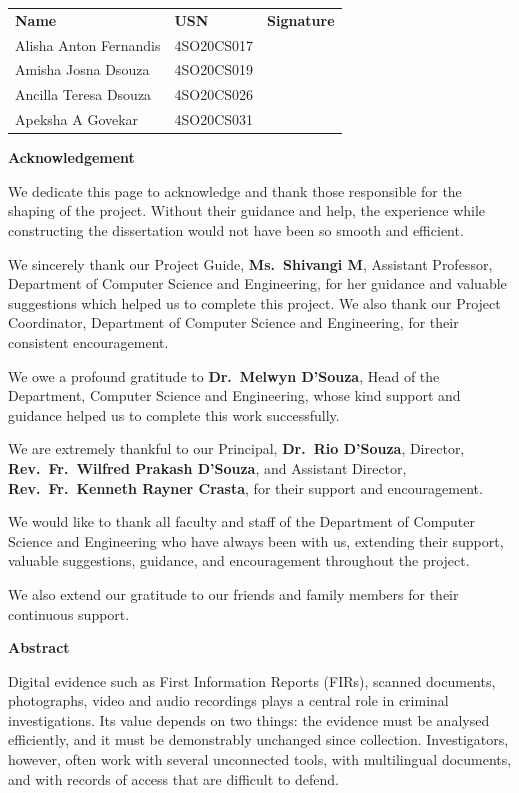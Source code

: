 \documentclass[12pt,a4paper,oneside]{report}
\begin{document}
\vspace{6pt}
\begin{tabular}{p{6.5cm}p{4cm}p{4cm}}
\textbf{Name} & \textbf{USN} & \textbf{Signature}\\[4pt]
Alisha Anton Fernandis & 4SO20CS017 & \\[4pt]
Amisha Josna Dsouza & 4SO20CS019 & \\[4pt]
Ancilla Teresa Dsouza & 4SO20CS026 & \\[4pt]
Apeksha A Govekar & 4SO20CS031 &
\end{tabular}
\clearpage

\begin{center}{\Large\bfseries Acknowledgement}\end{center}
We dedicate this page to acknowledge and thank those responsible for the shaping of the project. Without their guidance and help, the experience while constructing the dissertation would not have been so smooth and efficient.

We sincerely thank our Project Guide, \textbf{Ms.\ Shivangi M}, Assistant Professor, Department of Computer Science and Engineering, for her guidance and valuable suggestions which helped us to complete this project. We also thank our Project Coordinator, Department of Computer Science and Engineering, for their consistent encouragement.

We owe a profound gratitude to \textbf{Dr.\ Melwyn D'Souza}, Head of the Department, Computer Science and Engineering, whose kind support and guidance helped us to complete this work successfully.

We are extremely thankful to our Principal, \textbf{Dr.\ Rio D'Souza}, Director, \textbf{Rev.\ Fr.\ Wilfred Prakash D'Souza}, and Assistant Director, \textbf{Rev.\ Fr.\ Kenneth Rayner Crasta}, for their support and encouragement.

We would like to thank all faculty and staff of the Department of Computer Science and Engineering who have always been with us, extending their support, valuable suggestions, guidance, and encouragement throughout the project.

We also extend our gratitude to our friends and family members for their continuous support.
\clearpage
\begin{center}{\Large\bfseries Abstract}\end{center}
Digital evidence such as First Information Reports (FIRs), scanned documents, photographs, video and audio recordings plays a central role in criminal investigations. Its value depends on two things: the evidence must be analysed efficiently, and it must be demonstrably unchanged since collection. Investigators, however, often work with several unconnected tools, with multilingual documents, and with records of access that are difficult to defend.
\end{document}
